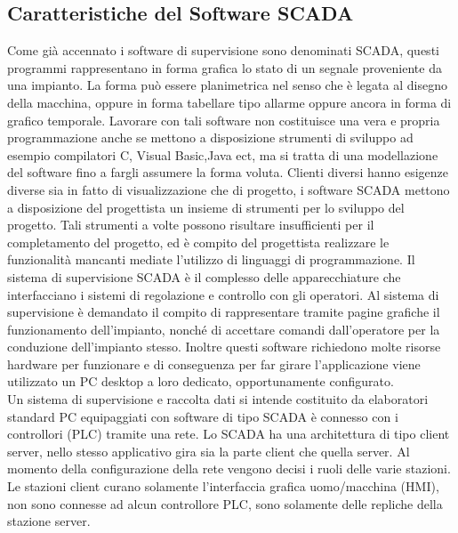 \documentclass[12pt, a4paper, oneside]{book}
\begin{document}
\subsection{Caratteristiche del Software SCADA}
Come già accennato i software di supervisione sono denominati SCADA, questi programmi rappresentano in forma grafica lo stato di un segnale proveniente da una impianto. La forma può essere planimetrica nel senso che è legata al disegno della macchina, oppure in forma tabellare tipo allarme oppure ancora in forma di grafico temporale. Lavorare con tali software non costituisce una vera e propria programmazione anche se mettono a disposizione strumenti di sviluppo ad esempio compilatori C, Visual Basic,Java ect, ma si tratta di una modellazione del software fino a fargli assumere la forma voluta. Clienti diversi hanno esigenze diverse sia in fatto di visualizzazione che di progetto, i software SCADA mettono a disposizione del progettista un insieme di strumenti per lo sviluppo del progetto. Tali strumenti a volte possono risultare insufficienti per il completamento del progetto, ed è compito del progettista realizzare le funzionalità mancanti mediate l'utilizzo di linguaggi di programmazione. Il sistema di supervisione SCADA è il complesso delle apparecchiature che interfacciano i sistemi di regolazione e controllo con gli operatori. Al sistema di supervisione è demandato il compito di rappresentare tramite pagine grafiche il funzionamento dell'impianto, nonché di accettare comandi dall'operatore per la conduzione dell'impianto stesso. Inoltre questi software richiedono molte risorse hardware per funzionare e di conseguenza per far girare l'applicazione viene utilizzato un PC desktop a loro dedicato, opportunamente configurato.
\\Un sistema di supervisione e raccolta dati si intende costituito da elaboratori standard PC equipaggiati con software di tipo SCADA è connesso con i controllori (PLC) tramite una rete. Lo SCADA ha una architettura di tipo client server, nello stesso applicativo gira sia la parte client che quella server. Al momento della configurazione della rete vengono decisi i ruoli delle varie stazioni. Le stazioni client curano solamente l'interfaccia grafica uomo/macchina (HMI), non sono connesse ad alcun controllore PLC, sono solamente delle repliche della stazione server.
\end{document}
